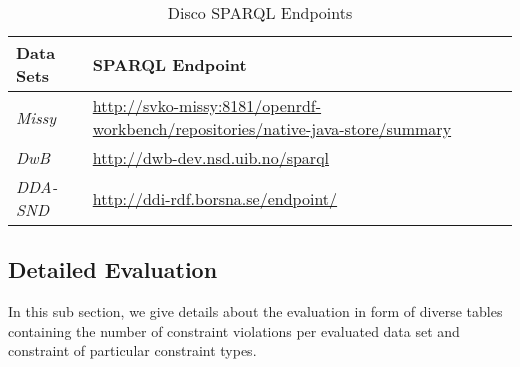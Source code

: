\documentclass{llncs}
\begin{document}
\begin{table}[H]
	\centering
		\begin{tabular}{l|l}
      \textbf{Data Sets} & \textbf{SPARQL Endpoint} \\		
      \hline
      \emph{Missy} & \url{http://svko-missy:8181/openrdf-workbench/repositories/native-java-store/summary} \\
			\emph{DwB} & \url{http://dwb-dev.nsd.uib.no/sparql} \\
			\emph{DDA-SND} & \url{http://ddi-rdf.borsna.se/endpoint/} \\
		\end{tabular}
	\caption{Disco SPARQL Endpoints}
	\label{tab:disco-sparql-endpoints}
\end{table}

\subsection{Detailed Evaluation}

In this sub section, we give details about the evaluation in form of diverse tables containing the number of constraint violations per evaluated data set and constraint of particular constraint types.
\end{document}
